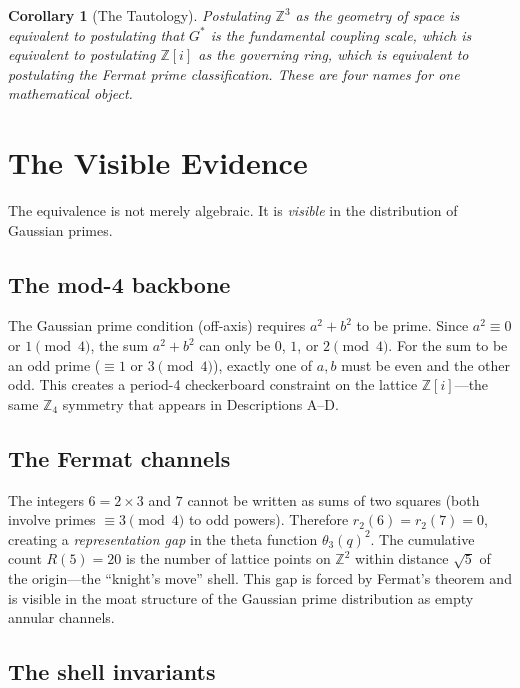\documentclass[12pt]{article}
\newtheorem{corollary}[theorem]{Corollary}
\theoremstyle{definition}
\theoremstyle{remark}
\begin{document}
\begin{corollary}[The Tautology]
\label{cor:tautology}
Postulating $\mathbb{Z}^3$ as the geometry of space is equivalent to postulating that $G^*$ is the fundamental coupling scale, which is equivalent to postulating $\mathbb{Z}[i]$ as the governing ring, which is equivalent to postulating the Fermat prime classification. These are four names for one mathematical object.
\end{corollary}

\section{The Visible Evidence}
\label{sec:visible}

The equivalence is not merely algebraic. It is \emph{visible} in the distribution of Gaussian primes.

\subsection{The mod-4 backbone}

The Gaussian prime condition (off-axis) requires $a^2 + b^2$ to be prime. Since $a^2 \equiv 0$ or $1 \pmod{4}$, the sum $a^2 + b^2$ can only be $0$, $1$, or $2 \pmod{4}$. For the sum to be an odd prime ($\equiv 1$ or $3 \pmod{4}$), exactly one of $a, b$ must be even and the other odd. This creates a period-4 checkerboard constraint on the lattice $\mathbb{Z}[i]$---the same $\mathbb{Z}_4$ symmetry that appears in Descriptions A--D.

\subsection{The Fermat channels}

The integers $6 = 2 \times 3$ and $7$ cannot be written as sums of two squares (both involve primes $\equiv 3 \pmod{4}$ to odd powers). Therefore $r_2(6) = r_2(7) = 0$, creating a \emph{representation gap} in the theta function $\theta_3(q)^2$. The cumulative count $R(5) = 20$ is the number of lattice points on $\mathbb{Z}^2$ within distance $\sqrt{5}$ of the origin---the ``knight's move'' shell. This gap is forced by Fermat's theorem and is visible in the moat structure of the Gaussian prime distribution as empty annular channels.

\subsection{The shell invariants}
\end{document}
